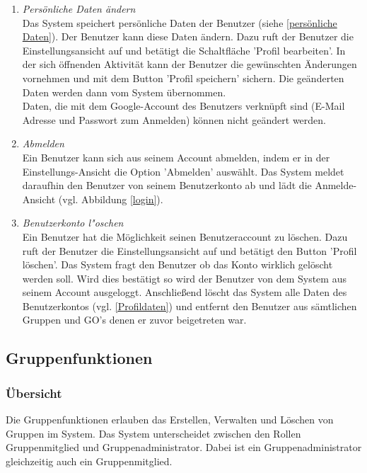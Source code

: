 \documentclass[parskip=full]{scrartcl}
\def\threedigits#1{%
  \ifnum#1<100 0\fi
  \ifnum#1<10 0\fi
  \number#1}
\begin{document}
\begin{enumerate}[label={\textbf{/F\protect\threedigits{\theenumi}0/}}, leftmargin=*]
	\item \colorbox{shadecolor}{\textit{Persönliche Daten ändern}\label{Persönliche Daten ändern}} \\ Das System speichert persönliche Daten der Benutzer (siehe  \ref{persönliche Daten}). Der Benutzer kann diese Daten ändern. Dazu ruft der Benutzer die Einstellungsansicht auf und betätigt die Schaltfläche 'Profil bearbeiten'. In der sich öffnenden Aktivität kann der Benutzer die gewünschten Änderungen vornehmen und mit dem Button 'Profil speichern' sichern. Die geänderten Daten werden dann vom System übernommen.\\
Daten, die mit dem Google-Account des Benutzers verknüpft sind (E-Mail Adresse und Passwort zum Anmelden) können nicht geändert werden.
	
	\item \textit{Abmelden}\label{Abmelden} \\ Ein Benutzer kann sich aus seinem Account abmelden, indem er in der Einstellungs-Ansicht die Option 'Abmelden' auswählt. Das System meldet daraufhin den Benutzer von seinem Benutzerkonto ab und lädt die Anmelde-Ansicht (vgl. Abbildung \ref{login}).
	
	\item \textit{Benutzerkonto l"oschen}\label{Benutzerkonto löschen}\\
	Ein Benutzer hat die Möglichkeit seinen Benutzeraccount zu löschen. Dazu ruft der Benutzer die Einstellungsansicht auf und betätigt den Button 'Profil löschen'. Das System fragt den Benutzer ob das Konto wirklich gelöscht werden soll. Wird dies bestätigt so wird der Benutzer von dem System aus seinem Account ausgeloggt. Anschließend löscht das System alle Daten des Benutzerkontos (vgl. \ref{Profildaten}) und entfernt den Benutzer aus sämtlichen Gruppen und GO's denen er zuvor beigetreten war.
\end{enumerate}

\subsection{Gruppenfunktionen}

\subsubsection{Übersicht}
Die Gruppenfunktionen erlauben das Erstellen, Verwalten und Löschen von Gruppen im System. Das System unterscheidet zwischen den Rollen Gruppenmitglied und Gruppenadministrator. Dabei ist ein Gruppenadministrator gleichzeitig auch ein Gruppenmitglied.
\end{document}
